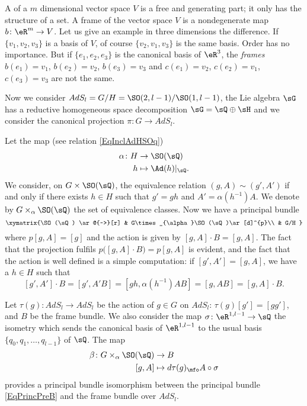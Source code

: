 A  of a $m$ dimensional vector space $V$ is a free and generating part; it only has the structure of a set. A frame of the vector space $V$ is a nondegenerate map $b\colon \eR^{m}\to V$. Let us give an example in three dimensions the difference. If $\{ v_{1},v_{2},v_{3} \}$ is a basis of $V$, of course $\{ v_{2},v_{1},v_{3} \}$ is the same basis. Order has no importance. But if $\{ e_{1},e_{2},e_{3} \}$ is the canonical basis of $\eR^{3}$, the \emph{frames} $b(e_{1})=v_1$, $b(e_{2})=v_2$, $b(e_{3})=v_{3}$ and $c(e_{1})=v_2$, $c(e_{2})=v_1$, $c(e_{3})=v_{3}$ are not the same.

Now we consider $AdS_l=G/H=\SO(2,l-1)/\SO(1,l-1)$, the Lie algebra $\sG$ has a reductive homogeneous space decomposition $\sG=\sQ\oplus\sH$ and we consider the canonical projection $\pi\colon G\to AdS_l$.

Let the map (see relation \eqref{EqInclAdHSOq})
\begin{equation}
	\begin{aligned}
		\alpha\colon H & \to \SO(\sQ)           \\
		h              & \mapsto \Ad(h)|_{\sQ}.
	\end{aligned}
\end{equation}
We consider, on $G\times\SO(\sQ)$, the equivalence relation $(g,A)\sim(g',A')$ if and only if there exists $h\in H$ such that $g'=gh$ and $A'=\alpha(h^{-1})A$. We denote by $G\times_{\alpha}\SO(\sQ)$ the set of equivalence classes. Now we have a principal bundle
\begin{equation}   \label{EqPrincPreB}
	\xymatrix{%
		\SO(\sQ) \ar@{~>}[r]     &   G\times_{\alpha}\SO(\sQ)\ar[d]^{p}\\
		&      G/H
	}
\end{equation}
where $p[g,A]=[g]$ and the action is given by $[g,A]\cdot B=[g,A]$. The fact that the projection fulfils $p\big( [g,A]\cdot B \big)=p[g,A]$ is evident, and the fact that the action is well defined is a simple computation:
if $[g',A']=[g,A]$, we have a $h\in H$ such that
\[
	[g',A']\cdot B=[g',A'B]
	=[gh,\alpha(h^{-1})AB]
	=[g,AB]
	=[g,A]\cdot B.
\]

\begin{proposition}
	Let $\tau(g)\colon AdS_l\to AdS_l$ be the action of $g\in G$ on $AdS_l$: $\tau(g)[g']=[gg']$, and $B$ be the frame bundle. We also consider the map $\sigma\colon \eR^{1,l-1}\to \sQ$ the isometry which sends the canonical basis of $\eR^{1,l-1}$ to the usual basis $\{ q_0,q_{1},\ldots,q_{l-1} \}$ of $\sQ$. The map
	\begin{equation}
		\begin{aligned}
			\beta\colon G\times_{\alpha} \SO(\sQ) & \to B                               \\
			[g,A]                                 & \mapsto d\tau(g)_{\mfo}A\circ\sigma
		\end{aligned}
	\end{equation}
	provides a principal bundle isomorphism between the principal bundle  \eqref{EqPrincPreB} and the frame bundle over $AdS_l$.

\end{proposition}

